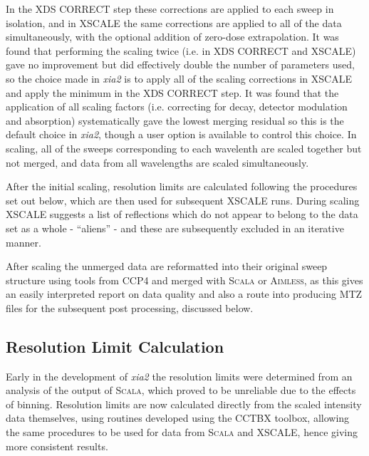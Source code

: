 \documentclass[preprint,pdf]{iucr}
\begin{document}
In the XDS CORRECT step these corrections are applied to each sweep in
isolation, and in XSCALE the same corrections are applied to all of the
data simultaneously, with the optional addition of zero-dose extrapolation. 
It was found that performing the scaling twice (i.e. in XDS CORRECT
and XSCALE)
gave no improvement but did effectively double the number of
parameters used, so the choice made in \emph{xia2} is to apply all of
the scaling corrections in XSCALE and apply the minimum in the XDS
CORRECT step. It was found that the application of all scaling factors
(i.e. correcting for decay, detector modulation and absorption)
systematically gave the lowest merging residual so this is the
default choice in \emph{xia2}, though a user option is available to
control this choice. In scaling, all of the sweeps corresponding to
each wavelenth are scaled together but not merged, and
data from all wavelengths are scaled simultaneously. 

After the initial scaling, resolution limits are calculated
following the procedures set out below, which are then used for subsequent
XSCALE runs. During scaling XSCALE suggests a
list of reflections which do not appear to belong to the data set as a
whole - ``aliens'' - and these are subsequently excluded in an iterative manner.

After scaling the unmerged data are reformatted into their original
sweep structure using tools from CCP4
and merged with \textsc{Scala} or \textsc{Aimless}, as this gives an
easily interpreted report on data quality and also a route into
producing MTZ files for the subsequent post processing, discussed below.

\subsection{Resolution Limit Calculation}

Early in the development of \emph{xia2} the resolution limits were
determined from an analysis of the output of \textsc{Scala}, which proved to be
unreliable due to the effects of binning. 
Resolution limits are now calculated directly from the
scaled intensity data themselves, using routines developed using
the CCTBX toolbox, allowing the same procedures to be used for data
from \textsc{Scala} and XSCALE, hence giving more consistent results.
\end{document}
